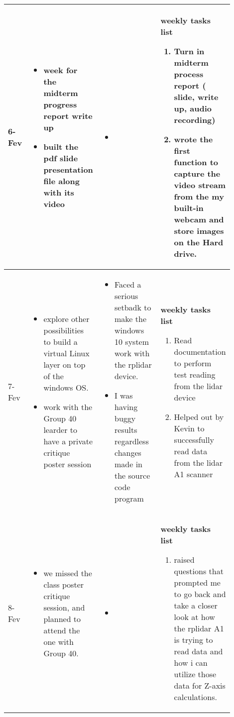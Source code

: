 \begin{longtable}{|l|p{0.3\linewidth}|p{0.3\linewidth}|p{0.3\linewidth}|}
		6-Fev	&
\begin{itemize}
\item week for the midterm progress report write up
\item built the pdf slide presentation file along with its video
\end{itemize}
			&
\begin{itemize}
\item 
\end{itemize}
			&
			\textbf{ weekly tasks list}
\begin{enumerate}
\item 	Turn in midterm process report ( slide, write up, audio recording)
\item wrote the first function to capture the video stream from the my built-in webcam and store images on the Hard drive.
\end{enumerate}
			\\\hline

		7-Fev	&
\begin{itemize}
\item explore other possibilities to build a virtual Linux layer on top of the windows OS.
\item work with the Group 40 learder to have a private critique poster session
\end{itemize}
			&
\begin{itemize}
\item Faced a serious setbadk to make the windows 10 system work with the rplidar device. 
\item I was having buggy results regardless changes made in the source code program
\end{itemize}
			&
			\textbf{ weekly tasks list}
\begin{enumerate}

\item Read documentation to perform test reading from the lidar device
\item Helped out by Kevin to successfully read data from the  lidar A1 scanner
\end{enumerate}

			\\\hline

		8-Fev	&
\begin{itemize}
\item we missed the class poster critique session, and planned to attend the one with Group 40.
\end{itemize}
			&
\begin{itemize}
\item 
\end{itemize}
			&
			\textbf{ weekly tasks list}
\begin{enumerate}
\item raised questions that prompted me to go back and take a closer look at how the rplidar A1  is trying to read data and how i can utilize those data for Z-axis calculations.
\end{enumerate}
			

\end{longtable}
